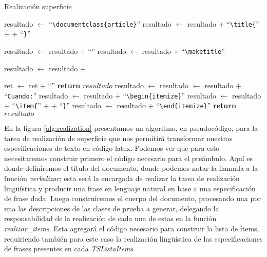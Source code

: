 \begin{algorithm}
  \caption{Realización superficie}\label{alg:realization}
  \begin{algorithmic}[1]
  
  \State resultado $\gets$ ``\verb|\documentclass{article}|''
  \State resultado $\gets$ resultado + ``\verb|\title{|'' +  + ``\verb|}|''
  
  \State resultado $\gets$ resultado + ``\verb||''
  \State resultado $\gets$ resultado + ``\verb|\maketitle|''
  
    \State resultado $\gets$ resultado +   
  \EndFor

  \State ret $\gets$ ret + ``\verb||''
  \State \textbf{return} $resultado$
  \EndFunction
  \Statex
    \State resultado $\gets$  
	\State resultado $\gets$ resultado + ``\verb|Cuando:|''
    \State resultado $\gets$ resultado + ``\verb|\begin{itemize}|''
      \State resultado $\gets$ resultado + ``\verb|\item{|'' +  + ``\verb|}|'' 
    \EndFor  
    \State resultado $\gets$ resultado + ``\verb|\end{itemize}|''
    \State \textbf{return} $resultado$
  \EndFunction
\end{algorithmic}
\end{algorithm}

En la figura \ref{alg:realization} presentamos un algoritmo, en pseudocódigo, para la tarea de realización de superficie que nos permitirá transformar nuestras especificaciones de texto en código latex. Podemos ver que para esto necesitaremos construir primero el código necesario para el preámbulo. Aquí es donde definiremos el título del documento, donde podemos notar la llamada a la función \emph{verbalizar}; esta será la encargada de realizar la tarea de realización lingüística y producir una frase en lenguaje natural en base a una especificación de frase dada. Luego construiremos el cuerpo del documento, procesando una por una las descripciones de las clases de prueba a generar, delegando la responsabilidad de la realización de cada una de estas en la función \emph{realizar\_items}. Esta agregará el código necesario para construir la lista de ítems, requiriendo también para este caso la realización lingüística de las especificaciones de frases presentes en cada \emph{TSListaItems}.

